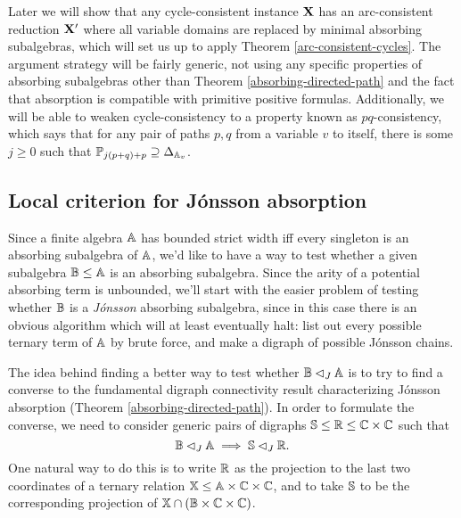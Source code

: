 \documentclass[letterpaper,11pt]{article}
\begin{document}
Later we will show that any cycle-consistent instance $\mathbf{X}$ has an arc-consistent reduction $\mathbf{X}'$ where all variable domains are replaced by minimal absorbing subalgebras, which will set us up to apply Theorem \ref{arc-consistent-cycles}. The argument strategy will be fairly generic, not using any specific properties of absorbing subalgebras other than Theorem \ref{absorbing-directed-path} and the fact that absorption is compatible with primitive positive formulas. Additionally, we will be able to weaken cycle-consistency to a property known as $pq$-consistency, which says that for any pair of paths $p,q$ from a variable $v$ to itself, there is some $j \ge 0$ such that $\mathbb{P}_{j(p+q)+p} \supseteq \Delta_{\mathbb{A}_v}$.


\subsection{Local criterion for J\'onsson absorption}

Since a finite algebra $\mathbb{A}$ has bounded strict width iff every singleton is an absorbing subalgebra of $\mathbb{A}$, we'd like to have a way to test whether a given subalgebra $\mathbb{B} \le \mathbb{A}$ is an absorbing subalgebra. Since the arity of a potential absorbing term is unbounded, we'll start with the easier problem of testing whether $\mathbb{B}$ is a \emph{J\'onsson} absorbing subalgebra, since in this case there is an obvious algorithm which will at least eventually halt: list out every possible ternary term of $\mathbb{A}$ by brute force, and make a digraph of possible J\'onsson chains.

The idea behind finding a better way to test whether $\mathbb{B} \lhd_J \mathbb{A}$ is to try to find a converse to the fundamental digraph connectivity result characterizing J\'onsson absorption (Theorem \ref{absorbing-directed-path}). In order to formulate the converse, we need to consider generic pairs of digraphs $\mathbb{S} \le \mathbb{R} \le \mathbb{C}\times \mathbb{C}$ such that
\[
\mathbb{B} \lhd_J \mathbb{A} \implies \mathbb{S} \lhd_J \mathbb{R}.
\]
One natural way to do this is to write $\mathbb{R}$ as the projection to the last two coordinates of a ternary relation $\mathbb{X} \le \mathbb{A}\times\mathbb{C}\times\mathbb{C}$, and to take $\mathbb{S}$ to be the corresponding projection of $\mathbb{X} \cap (\mathbb{B}\times\mathbb{C}\times\mathbb{C})$.
\end{document}
